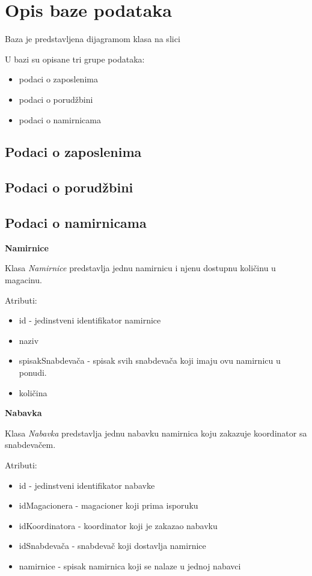 \section{\bfseries Opis baze podataka}
Baza je predstavljena dijagramom klasa na slici %

U bazi su opisane tri grupe podataka:
\begin{itemize}
    \item podaci o zaposlenima
    \item podaci o porudžbini
    \item podaci o namirnicama
\end{itemize}

\subsection{Podaci o zaposlenima}
\subsection{Podaci o porudžbini}
\subsection{Podaci o namirnicama}

\textbf{\large Namirnice}
\vspace{0.3cm}

Klasa \textit{Namirnice} predstavlja jednu namirnicu i njenu dostupnu količinu u magacinu.

Atributi:
\begin{itemize}
    \item id - jedinstveni identifikator namirnice
    \item naziv 
    \item spisakSnabdevača - spisak svih snabdevača koji imaju ovu namirnicu u ponudi.
    \item količina
\end{itemize}

\textbf{\large Nabavka}
\vspace{0.3cm}

Klasa \textit{Nabavka} predstavlja jednu nabavku namirnica koju zakazuje koordinator sa snabdevačem.

Atributi:
\begin{itemize}
    \item id - jedinstveni identifikator nabavke
    \item idMagacionera - magacioner koji prima isporuku 
    \item idKoordinatora - koordinator koji je zakazao nabavku
    \item idSnabdevača - snabdevač koji dostavlja namirnice
    \item namirnice - spisak namirnica koji se nalaze u jednoj nabavci
\end{itemize}

